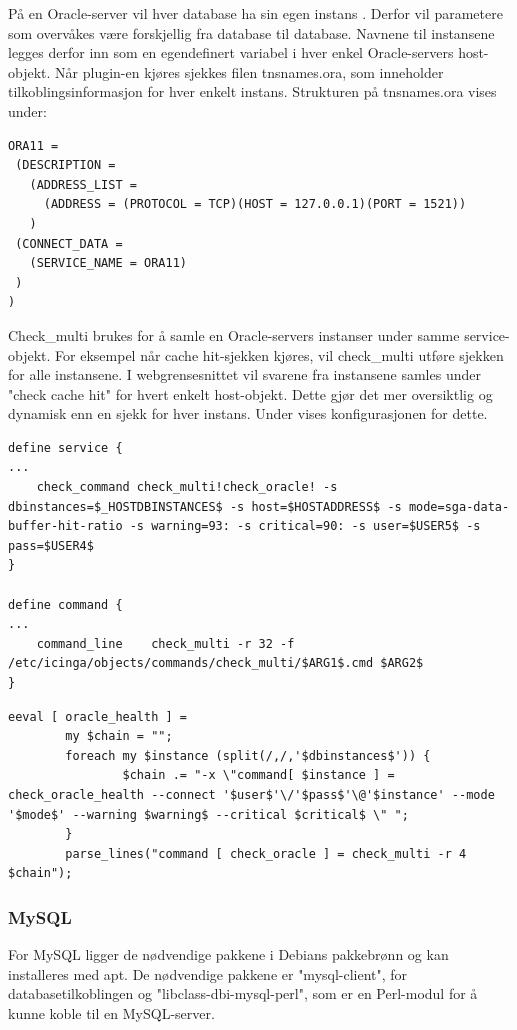 På en Oracle-server vil hver database ha sin egen instans \cite{oraclefaq}. Derfor vil parametere som overvåkes være forskjellig fra database til database. Navnene til instansene legges derfor inn som en egendefinert variabel i hver enkel Oracle-servers host-objekt. Når plugin-en kjøres sjekkes filen tnsnames.ora, som inneholder tilkoblingsinformasjon for hver enkelt instans. Strukturen på tnsnames.ora vises under:
\begin{lstlisting}
ORA11 =
 (DESCRIPTION = 
   (ADDRESS_LIST =
     (ADDRESS = (PROTOCOL = TCP)(HOST = 127.0.0.1)(PORT = 1521))
   )
 (CONNECT_DATA =
   (SERVICE_NAME = ORA11)
 )
)
\end{lstlisting}
Check\_multi brukes for å samle en Oracle-servers instanser under samme service-objekt. For eksempel når cache hit-sjekken kjøres, vil check\_multi utføre sjekken for alle instansene. I webgrensesnittet vil svarene fra instansene samles under "check cache hit" for hvert enkelt host-objekt. Dette gjør det mer oversiktlig og dynamisk enn en sjekk for hver instans. Under vises konfigurasjonen for dette.

\begin{lstlisting}
define service {
...
	check_command check_multi!check_oracle! -s dbinstances=$_HOSTDBINSTANCES$ -s host=$HOSTADDRESS$ -s mode=sga-data-buffer-hit-ratio -s warning=93: -s critical=90: -s user=$USER5$ -s pass=$USER4$
}

define command {
...
	command_line	check_multi -r 32 -f /etc/icinga/objects/commands/check_multi/$ARG1$.cmd $ARG2$
}
\end{lstlisting}
\begin{lstlisting}
eeval [ oracle_health ] =
    	my $chain = "";
    	foreach my $instance (split(/,/,'$dbinstances$')) {
            	$chain .= "-x \"command[ $instance ] = check_oracle_health --connect '$user$'\/'$pass$'\@'$instance' --mode '$mode$' --warning $warning$ --critical $critical$ \" ";
    	}
    	parse_lines("command [ check_oracle ] = check_multi -r 4 $chain");

\end{lstlisting}

\subsubsection{MySQL}
For MySQL ligger de nødvendige pakkene i Debians pakkebrønn og kan installeres med apt. De nødvendige pakkene er "mysql-client", for databasetilkoblingen og "libclass-dbi-mysql-perl", som er en Perl-modul for å kunne koble til en MySQL-server. 
